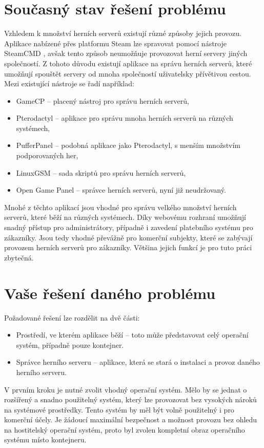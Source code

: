 \documentclass{article}
\begin{document}
\section{Současný stav řešení problému}
Vzhledem k množství herních serverů existují různé způsoby jejich provozu. Aplikace nabízené přes platformu Steam lze spravovat pomocí nástroje
SteamCMD \cite{steamcmd}, avšak tento způsob neumožňuje provozovat herní servery jiných společností.
Z tohoto důvodu existují aplikace na správu herních serverů, které umožňují spouštět servery od mnoha společností uživatelsky přívětivou cestou.
Mezi existující nástroje se řadí například:
\begin{itemize}
    \item GameCP -- placený nástroj pro správu herních serverů,
    \item Pterodactyl -- aplikace pro správu mnoha herních serverů na různých systémech,
    \item PufferPanel -- podobná aplikace jako Pterodactyl, s menším množstvím podporovaných her,
    \item LinuxGSM -- sada skriptů pro správu herních serverů,
    \item Open Game Panel -- správce herních serverů, nyní již neudržovaný.
\end{itemize}
Mnohé z těchto aplikací jsou vhodné pro správu velkého množství herních serverů, které běží na různých systémech. Díky webovému rozhraní umožňují snadný
přístup pro administrátory, případně i zavedení platebního systému pro zákazníky. Jsou tedy vhodné převážně pro komerční subjekty, které se zabývají
provozem herních serverů pro zákazníky. Většina jejich funkcí je pro tuto práci zbytečná.


\section{Vaše řešení daného problému}
Požadované řešení lze rozdělit na dvě části:
\begin{itemize}
    \item Prostředí, ve kterém aplikace běží -- toto může představovat celý operační systém, případně pouze kontejner.
    \item Správce herního serveru -- aplikace, která se stará o instalaci a provoz daného herního serveru.
\end{itemize}
V prvním kroku je nutné zvolit vhodný operační systém. Mělo by se jednat o rozšířený a snadno použitelný systém,
který lze provozovat bez vysokých nároků na systémové prostředky. Tento systém by měl být volně použitelný i pro komerční účely.
Je žádoucí maximální bezpečnost a možnost provozu bez ohledu na hostitelský operační systém, proto byl zvolen kompletní obraz operačního systému
místo kontejneru.
\end{document}
